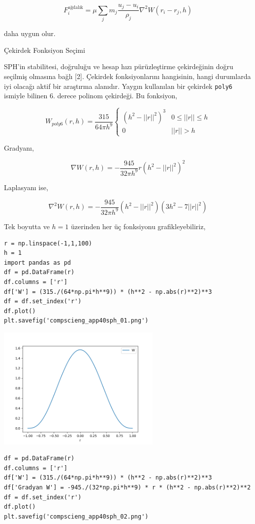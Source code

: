 \documentclass[12pt,fleqn]{article}\usepackage{../../common}
\begin{document}
$$
F_i^{\textrm{ağdalık}} = \mu \sum_j m_j \frac{u_j-u_i}{\rho_j} \nabla^2 W (r_i-r_j, h)
$$

daha uygun olur.

Çekirdek Fonksiyon Seçimi

SPH'in stabilitesi, doğruluğu ve hesap hızı pürüzleştirme çekirdeğinin doğru
seçilmiş olmasına bağlı [2]. Çekirdek fonksiyonlarını hangisinin, hangi
durumlarda iyi olacağı aktif bir araştırma alanıdır. Yaygın kullanılan bir
çekirdek \verb!poly6! ismiyle bilinen 6. derece polinom çekirdeği. Bu fonksiyon,

$$
W_{poly6} (r, h) = \frac{315}{64 \pi h^9}
\left\{ \begin{array}{ll}
(h^2 - ||r||^2)^3 & 0 \le ||r|| \le h \\
0 & ||r|| > h
\end{array} \right.
$$

Gradyanı,

$$
\nabla W (r, h) =
- \frac{945}{32 \pi h^9} r ( h^2 - ||r||^2)^2
$$

Laplasyanı ise,

$$
\nabla^2 W (r, h) =
- \frac{945}{32\pi h^9} (h^2 - ||r||^2)(3 h^2 - 7||r||^2)
$$

Tek boyutta ve $h=1$ üzerinden her üç fonksiyonu grafikleyebiliriz,

\begin{verbatim}
r = np.linspace(-1,1,100)
h = 1
import pandas as pd
df = pd.DataFrame(r)
df.columns = ['r']
df['W'] = (315./(64*np.pi*h**9)) * (h**2 - np.abs(r)**2)**3
df = df.set_index('r')
df.plot()
plt.savefig('compscieng_app40sph_01.png')
\end{verbatim}

\includegraphics[height=6cm]{compscieng_app40sph_01.png}

\begin{verbatim}
df = pd.DataFrame(r)
df.columns = ['r']
df['W'] = (315./(64*np.pi*h**9)) * (h**2 - np.abs(r)**2)**3
df['Gradyan W'] = -945./(32*np.pi*h**9) * r * (h**2 - np.abs(r)**2)**2
df = df.set_index('r')
df.plot()
plt.savefig('compscieng_app40sph_02.png')
\end{verbatim}
\end{document}
